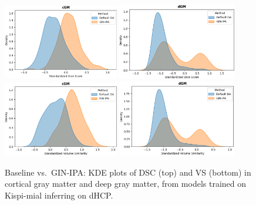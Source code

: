 \begin{figure}[htbp]
  \centering
  \includegraphics[width=0.45\textwidth]{figures/1_mial-dhcp_DC_cGM.png}\quad
  \includegraphics[width=0.46\textwidth]{figures/1_mial-dhcp_DC_dGM.png}
  \vspace{10pt}
  \includegraphics[width=0.45\textwidth]{figures/1_mial-dhcp_VS_cGM.png}\quad
  \includegraphics[width=0.46\textwidth]{figures/1_mial-dhcp_VS_dGM.png}
   \caption{Baseline vs.\ GIN-IPA: KDE plots of DSC (top) and VS (bottom) in cortical gray matter and deep gray matter, from models trained on Kispi-mial inferring on dHCP.}
  \label{fig:1_mial_dhcp_gm}
\end{figure}

